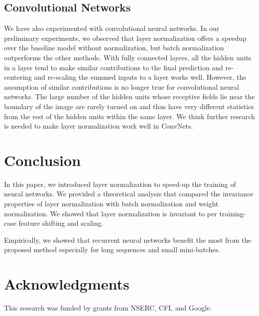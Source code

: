 \documentclass{article}
\begin{document}
\subsection{Convolutional Networks}
\label{sec:convnets}

We have also experimented with convolutional neural networks. In our preliminary experiments, we observed that layer normalization offers a speedup over the baseline model without normalization, but batch normalization outperforms the other methods. With fully connected layers, all the hidden units in a layer tend to make similar contributions to the final prediction and re-centering and re-scaling the summed inputs to a layer works well.  However, the assumption of similar contributions is no longer true for convolutional neural networks. The large number of the hidden units whose receptive fields lie near the boundary of the image are rarely turned on and thus have very different statistics from the rest of the hidden units within the same layer. We think further research is needed to make layer normalization work well in ConvNets.


\section{Conclusion}
\label{sec:discussion}

In this paper, we introduced layer normalization to speed-up the  training of neural networks. We provided a theoretical analysis that compared the invariance properties of layer normalization with batch normalization and weight normalization. We showed that layer normalization is invariant to per training-case feature shifting and scaling.

Empirically, we showed that recurrent neural networks benefit the most from the proposed method especially for long sequences and small mini-batches. 


\section*{Acknowledgments}   
\vspace{-0.1in}
This research was funded by grants from NSERC, CFI, and Google.

\pagebreak
\setlength{\bibsep}{5pt plus 0.3ex}
\begin{small}
\vspace{-0.1in}

\end{small}

\newpage
\end{document}
